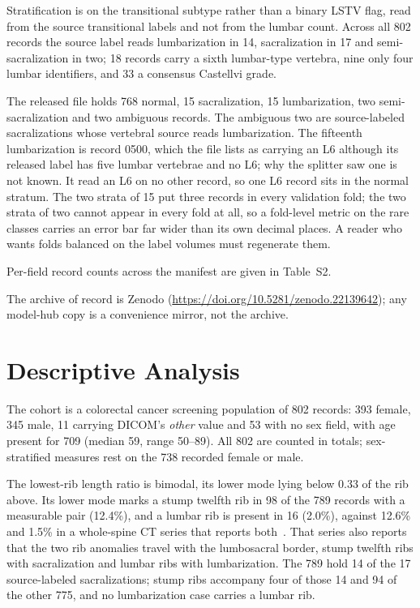 \documentclass[aapm,mph,amsmath,amssymb,reprint]{revtex4-2}
\newcommand{\datasetdoi}{10.5281/zenodo.22139642}
\newcommand{\doiurl}[1]{\url{https://doi.org/#1}}
\begin{document}
Stratification is on the transitional subtype rather than a binary LSTV flag, read from the
source transitional labels and not from the lumbar count. Across all 802 records the source
label reads lumbarization in 14, sacralization in 17 and semi-sacralization in two; 18
records carry a sixth lumbar-type vertebra, nine only four lumbar identifiers, and 33 a
consensus Castellvi grade.

The released file holds 768 normal, 15 sacralization, 15 lumbarization, two
semi-\hspace{0pt}sacralization and two ambiguous records. The ambiguous two are source-labeled
sacralizations whose vertebral source reads lumbarization. The fifteenth lumbarization is
record 0500, which the file lists as carrying an L6 although its released label has five
lumbar vertebrae and no L6; why the splitter saw one is not known. It read an L6 on no other
record, so one L6 record sits in the normal stratum. The two strata of 15 put three records
in every validation fold; the two strata of two cannot appear in every fold at all, so a
fold-level metric on the rare classes carries an error bar far wider than its own decimal
places. A reader who wants folds balanced on the label volumes must regenerate them.

Per-field record counts across the manifest are given in Table~S2.

The archive of record is Zenodo (\doiurl{\datasetdoi}); any model-hub copy is a convenience
mirror, not the archive.

\section{Descriptive Analysis}
\label{sec:descriptive}


The cohort is a colorectal cancer screening population of 802 records: 393 female, 345 male,
11 carrying DICOM's \emph{other} value and 53 with no sex field, with age present for 709
(median 59, range 50--89). All 802 are counted in totals; sex-stratified measures rest on the
738 recorded female or male.

The lowest-rib length ratio is bimodal,
its lower mode lying below 0.33 of the rib above. Its lower mode marks a stump twelfth rib in 98 of the 789 records with a measurable pair
(12.4\%), and a lumbar rib is present in 16 (2.0\%), against 12.6\% and 1.5\% in a
whole-spine CT series that reports both~\cite{nagata2025}. That series also reports that the
two rib anomalies travel with the lumbosacral border, stump twelfth ribs with sacralization
and lumbar ribs with lumbarization. The 789 hold 14 of the 17 source-labeled
sacralizations; stump ribs accompany four of those 14 and 94 of the other 775, and no
lumbarization case carries a lumbar rib.
\end{document}
